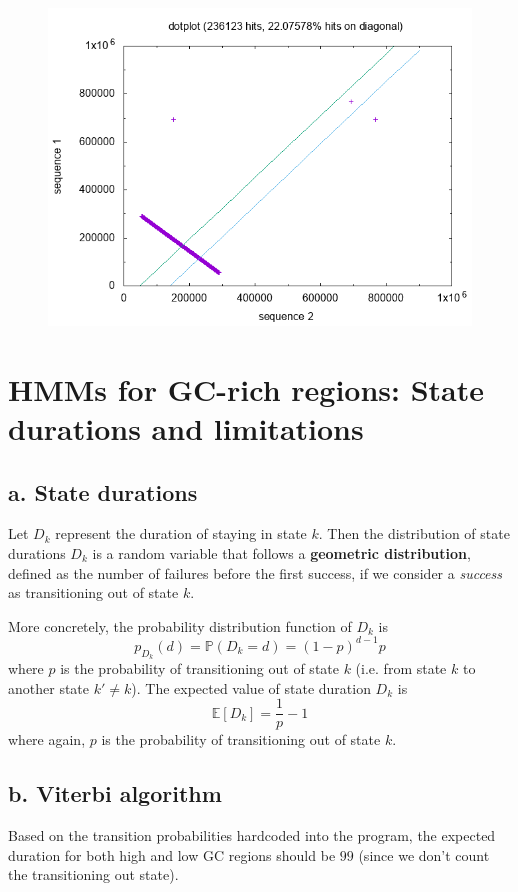 \documentclass[a4paper]{article}
\begin{document}
\begin{figure}
\includegraphics[width=\textwidth]{./human-hoxa-inverted.png}
\end{figure}

\section{HMMs for GC-rich regions: State durations and limitations}

\subsection*{a. State durations}
Let $D_k$ represent the duration of staying in state $k$. Then the
distribution of state durations $D_k$ is a random variable that follows a
{\bf geometric distribution}, defined as the number of failures
before the first success, if we consider a {\it success} as transitioning out of 
state $k$.

More concretely, the probability distribution function of $D_k$ is
\[
p_{D_k}(d) = \mathbb{P}(D_k = d) = (1 - p)^{d - 1}p
\]
where $p$ is the probability of transitioning out of state $k$ (i.e. from state $k$
to another state $k' \neq k$). The expected value of state duration
$D_k$ is
\[
    \mathbb{E}[D_k] = \frac{1}{p} - 1
\]
where again, $p$ is the probability of transitioning out of state $k$.

\subsection*{b. Viterbi algorithm}
Based on the transition probabilities hardcoded into the program, 
the expected duration for both high and low GC regions 
should be $99$ (since we don't count the transitioning out state).
\end{document}

